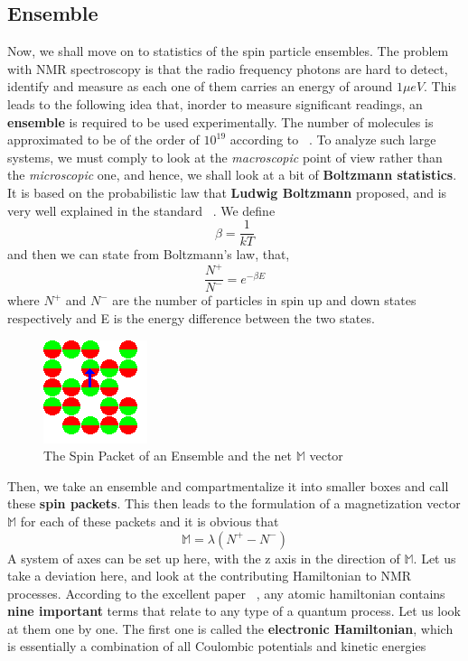 \documentclass[12pt]{article}
\begin{document}
\subsection{Ensemble}
Now, we shall move on to statistics of the spin particle ensembles. The problem with NMR spectroscopy is that the radio frequency photons are hard to detect, identify and measure as each one of them carries an energy of around $1\mu eV$. This leads to the following idea that, inorder to measure significant readings, an \textbf{ensemble} is required to be used experimentally. The number of molecules is approximated to be of the order of $10^{19}$ according to ~\cite{JAJ}. To analyze such large systems, we must comply to look at the \textit{macroscopic} point of view rather than the \textit{microscopic} one, and hence, we shall look at a bit of \textbf{Boltzmann statistics}. It is based on the probabilistic law that \textbf{Ludwig Boltzmann} proposed, and is very well explained in the standard ~\cite{Feyn}. We define $$\beta = \frac{1}{kT}$$ and then we can state from Boltzmann's law, that, 
$$\frac{N^{+}}{N^{-}} = e^{-\beta E}$$ where $N^+$ and $N^-$ are the number of particles in spin up and down states respectively and E is the energy difference between the two states. 
\begin{figure}
\begin{center}
\includegraphics[scale=1]{ens1.png}
\end{center}
\caption{The Spin Packet of an Ensemble and the net $\mathbb{M}$ vector}
\end{figure}
Then, we take an ensemble and compartmentalize it into smaller boxes and call these \textbf{spin packets}. This then leads to the formulation of a magnetization vector $\mathbb{M}$ for each of these packets and it is obvious that $$\mathbb{M} =  \lambda (N^+ - N^-)$$ A system of axes can be set up here, with the z axis in the direction of $\mathbb{M}$. Let us take a deviation here, and look at the contributing Hamiltonian to NMR processes. According to the excellent paper ~\cite{ohio}, any atomic hamiltonian contains \textbf{nine important} terms that relate to any type of a quantum process. Let us look at them one by one. The first one is called the \textbf{electronic Hamiltonian}, which is essentially a combination of all Coulombic potentials and kinetic energies
\end{document}

